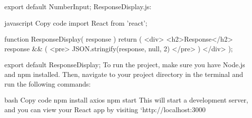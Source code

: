 export default NumberInput;
ResponseDisplay.js:

javascript
Copy code
import React from 'react';

function ResponseDisplay({ response }) {
  return (
    <div>
      <h2>Response</h2>
      {response && (
        <pre>
          {JSON.stringify(response, null, 2)}
        </pre>
      )}
    </div>
  );
}

export default ResponseDisplay;
To run the project, make sure you have Node.js and npm installed. Then, navigate to your project directory in the terminal and run the following commands:

bash
Copy code
npm install axios
npm start
This will start a development server, and you can view your React app by visiting `http://localhost:3000